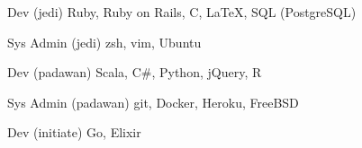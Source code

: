 
\begin{cvskills}

  \cvskill
    {Dev (jedi)} %
    {Ruby, Ruby on Rails, C, LaTeX, SQL (PostgreSQL)} %

  \cvskill
    {Sys Admin (jedi)} %
    {zsh, vim, Ubuntu} %

  \cvskill
    {Dev (padawan)} %
    {Scala, C\#, Python, jQuery, R} %

  \cvskill
    {Sys Admin (padawan)} %
    {git, Docker, Heroku, FreeBSD} %

  \cvskill
    {Dev (initiate)} %
    {Go, Elixir} %
\end{cvskills}

